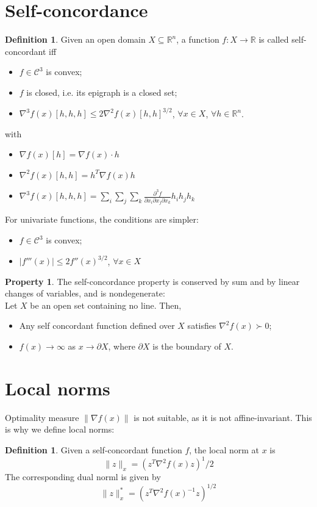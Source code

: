\documentclass[12pt, openany]{report}
\newcommand{\R}{\mathbb{R}}
\theoremstyle{definition}
\newtheorem{definition}[thm]{Definition}
\newtheorem{prop}[thm]{Property}
\begin{document}
\section{Self-concordance}
\begin{definition}
    Given an open domain $X\subseteq \R^n$, a function $f:X\rightarrow \R$ is called self-concordant iff 
    \begin{itemize}
        \item $f\in \mathcal{C}^3$ is convex;
        \item $f$ is closed, i.e. its epigraph is a closed set;
        \item $\nabla^3f(x)[h,h,h]\le 2\nabla^2 f(x)[h,h]^{3/2}$, $\forall x\in X$, $\forall h\in \R^n$.
    \end{itemize}
    with 
    \begin{itemize}
        \item $\nabla f(x)[h] = \nabla f(x) \cdot h$
        \item $\nabla^2f(x)[h,h] = h^T\nabla f(x)h$
        \item $\nabla^3f(x)[h,h,h] = \sum_i\sum_j\sum_k \frac{\partial^3 f}{\partial x_i \partial x_j \partial x_k}h_ih_jh_k$
    \end{itemize}
\end{definition}
For univariate functions, the conditions are simpler:
\begin{itemize}
    \item $f\in \mathcal{C}^3$ is convex;
    \item $|f'''(x)|\le 2f''(x)^{3/2}$, $\forall x \in X$
\end{itemize}
\begin{prop}
    The self-concordance property is conserved by sum and by linear changes of variables, and is nondegenerate:\\
    Let $X$ be an open set containing no line. Then,
    \begin{itemize}
        \item Any self concordant function defined over $X$ satisfies $\nabla^2f(x)\succ 0$;
        \item $f(x)\rightarrow \infty$ as $x\rightarrow \partial X$, where $\partial X$ is the boundary of $X$.
    \end{itemize}
\end{prop}
\section{Local norms}
Optimality measure $\lVert \nabla f(x)\rVert$ is not suitable, as it is not affine-invariant. This is why we define local norms:
\begin{definition}
    Given a self-concordant function $f$, the local norm at $x$ is 
    \begin{equation}
        \lVert z\rVert_x = (z^T\nabla^2f(x)z)^1/2
    \end{equation}
    The corresponding dual norml is given by
    \begin{equation}
        \lVert z\rVert_x^* = (z^T\nabla^2f(x)^{-1}z)^{1/2}
    \end{equation}
\end{definition}
\end{document}
